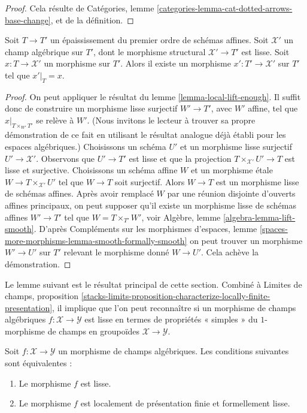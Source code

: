 \begin{proof}
Cela résulte de
Catégories, lemme \ref{categories-lemma-cat-dotted-arrows-base-change},
et de la définition.
\end{proof}

\begin{lemma}
\label{lemma-lift-to-smooth}
Soit $T \to T'$ un épaississement du premier ordre de schémas affines.
Soit $\mathcal{X}'$ un champ algébrique sur $T'$,
dont le morphisme structural $\mathcal{X}' \to T'$ est lisse.
Soit $x : T \to \mathcal{X}'$ un morphisme
sur $T'$. Alors il existe un morphisme $x' : T' \to \mathcal{X}'$
sur $T'$ tel que $x'|_T = x$.
\end{lemma}

\begin{proof}
On peut appliquer le résultat du lemme \ref{lemma-local-lift-enough}.
Il suffit donc de construire un morphisme lisse surjectif
$W' \to T'$, avec $W'$ affine, tel que
$x|_{T \times_{W'} T'}$ se relève à $W'$.
(Nous invitons le lecteur à trouver sa propre démonstration de ce fait
en utilisant le résultat analogue déjà établi
pour les espaces algébriques.) Choisissons un
schéma $U'$ et un morphisme lisse surjectif $U' \to \mathcal{X}'$.
Observons que $U' \to T'$ est lisse et que la projection
$T \times_{\mathcal{X}'} U' \to T$ est lisse et surjective.
Choisissons un schéma affine $W$ et un morphisme \'etale
$W \to T \times_{\mathcal{X}'} U'$ tel que $W \to T$
soit surjectif. Alors $W \to T$ est un morphisme lisse de
schémas affines. Après avoir remplacé $W$ par une réunion disjointe d'ouverts
affines principaux, on peut supposer qu'il existe un
morphisme lisse de schémas affines $W' \to T'$ tel que
$W = T \times_{T'} W'$, voir Algèbre, lemme \ref{algebra-lemma-lift-smooth}.
D'après Compléments sur les morphismes d'espaces, lemme
\ref{spaces-more-morphisms-lemma-smooth-formally-smooth}
on peut trouver un morphisme $W' \to U'$ sur $T'$ relevant
le morphisme donné $W \to U'$. Cela achève la démonstration.
\end{proof}

\noindent
Le lemme suivant est le résultat principal de cette section.
Combiné à
Limites de champs, proposition
\ref{stacks-limits-proposition-characterize-locally-finite-presentation},
il implique que l'on peut reconnaître si un morphisme de champs algébriques
$f : \mathcal{X} \to \mathcal{Y}$ est lisse en termes de
propriétés « simples » du $1$-morphisme de champs en groupoïdes
$\mathcal{X} \to \mathcal{Y}$.

\begin{lemma}
\label{lemma-smooth-formally-smooth}
Soit $f : \mathcal{X} \to \mathcal{Y}$ un morphisme de champs algébriques.
Les conditions suivantes sont équivalentes :
\begin{enumerate}
\item Le morphisme $f$ est lisse.
\item Le morphisme $f$ est localement de présentation finie et
formellement lisse.
\end{enumerate}
\end{lemma}

